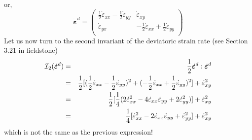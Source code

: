 or,
\[
\dot{\bm \varepsilon}^d = 
\left(
\begin{array}{cc}
\frac{1}{2}\dot{\varepsilon}_{xx} -\frac{1}{2}\dot{\varepsilon}_{yy} & \dot{\varepsilon}_{xy}  \\
\dot{\varepsilon}_{yx} & -\frac{1}{2}\dot{\varepsilon}_{xx} +\frac{1}{2} \dot{\varepsilon}_{yy}  \\
\end{array}
\right)
\]
Let us now turn to the second invariant of the deviatoric strain rate 
(see Section 3.21 in fieldstone)
\begin{eqnarray}
{\cal I}_2(\dot{\bm{\varepsilon}}^d)
&=& \frac{1}{2} \dot{\bm{\varepsilon}}^d:\dot{\bm{\varepsilon}}^d \nonumber\\
&=& \frac{1}{2}[ (\frac{1}{2}\dot{\varepsilon}_{xx} -\frac{1}{2}\dot{\varepsilon}_{yy})^2 + (-\frac{1}{2}\dot{\varepsilon}_{xx} +\frac{1}{2} \dot{\varepsilon}_{yy})^2  ] + \dot{\varepsilon}_{xy}^2 \nonumber\\
&=& \frac12 [ \frac14 (2\dot{\varepsilon}_{xx}^2  -4 \dot{\varepsilon}_{xx}\dot{\varepsilon}_{yy} +2\dot{\varepsilon}_{yy}^2 )  ] + \dot{\varepsilon}_{xy}^2 \nonumber\\
&=& \frac14 [ \dot{\varepsilon}_{xx}^2  -2 \dot{\varepsilon}_{xx}\dot{\varepsilon}_{yy} +\dot{\varepsilon}_{yy}^2   ] + \dot{\varepsilon}_{xy}^2 
\end{eqnarray}
which is not the same as the previous expression! 




